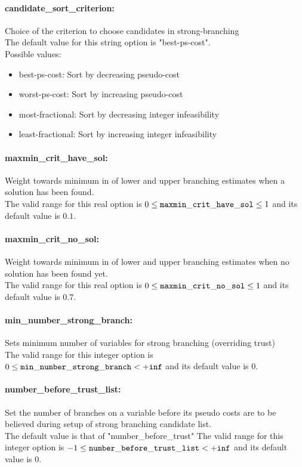 \paragraph{candidate\_sort\_criterion:} Choice of the criterion to choose candidates in strong-branching $\;$ \\

The default value for this string option is "best-ps-cost".
\\ 
Possible values:
\begin{itemize}
   \item best-ps-cost: Sort by decreasing pseudo-cost
   \item worst-ps-cost: Sort by increasing pseudo-cost
   \item most-fractional: Sort by decreasing integer infeasibility
   \item least-fractional: Sort by increasing integer infeasibility
\end{itemize}

\paragraph{maxmin\_crit\_have\_sol:} Weight towards minimum in of lower and upper branching estimates when a solution has been found. $\;$ \\
 The valid range for this real option is 
$0 \le {\tt maxmin\_crit\_have\_sol } \le 1$
and its default value is $0.1$.


\paragraph{maxmin\_crit\_no\_sol:} Weight towards minimum in of lower and upper branching estimates when no solution has been found yet. $\;$ \\
 The valid range for this real option is 
$0 \le {\tt maxmin\_crit\_no\_sol } \le 1$
and its default value is $0.7$.


\paragraph{min\_number\_strong\_branch:} Sets minimum number of variables for strong branching (overriding trust) $\;$ \\
 The valid range for this integer option is
$0 \le {\tt min\_number\_strong\_branch } <  {\tt +inf}$
and its default value is $0$.


\paragraph{number\_before\_trust\_list:} Set the number of branches on a variable before its pseudo costs are to be believed during setup of strong branching candidate list. $\;$ \\
 The default value is that of
"number\_before\_trust" The valid range for this integer option is
$-1 \le {\tt number\_before\_trust\_list } <  {\tt +inf}$
and its default value is $0$.


